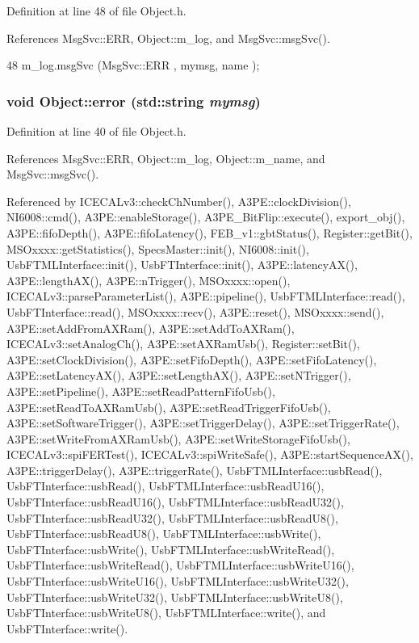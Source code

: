 Definition at line 48 of file Object.h.

References MsgSvc::ERR, Object::m\_\-log, and MsgSvc::msgSvc().


\begin{DoxyCode}
48 { m_log.msgSvc (MsgSvc::ERR     , mymsg, name ); }
\end{DoxyCode}
\hypertarget{classObject_a204a95f57818c0f811933917a30eff45}{
\subsubsection[{error}]{\setlength{\rightskip}{0pt plus 5cm}void Object::error (std::string {\em mymsg})}}
\label{classObject_a204a95f57818c0f811933917a30eff45}


Definition at line 40 of file Object.h.

References MsgSvc::ERR, Object::m\_\-log, Object::m\_\-name, and MsgSvc::msgSvc().

Referenced by ICECALv3::checkChNumber(), A3PE::clockDivision(), NI6008::cmd(), A3PE::enableStorage(), A3PE\_\-BitFlip::execute(), export\_\-obj(), A3PE::fifoDepth(), A3PE::fifoLatency(), FEB\_\-v1::gbtStatus(), Register::getBit(), MSOxxxx::getStatistics(), SpecsMaster::init(), NI6008::init(), UsbFTMLInterface::init(), UsbFTInterface::init(), A3PE::latencyAX(), A3PE::lengthAX(), A3PE::nTrigger(), MSOxxxx::open(), ICECALv3::parseParameterList(), A3PE::pipeline(), UsbFTMLInterface::read(), UsbFTInterface::read(), MSOxxxx::recv(), A3PE::reset(), MSOxxxx::send(), A3PE::setAddFromAXRam(), A3PE::setAddToAXRam(), ICECALv3::setAnalogCh(), A3PE::setAXRamUsb(), Register::setBit(), A3PE::setClockDivision(), A3PE::setFifoDepth(), A3PE::setFifoLatency(), A3PE::setLatencyAX(), A3PE::setLengthAX(), A3PE::setNTrigger(), A3PE::setPipeline(), A3PE::setReadPatternFifoUsb(), A3PE::setReadToAXRamUsb(), A3PE::setReadTriggerFifoUsb(), A3PE::setSoftwareTrigger(), A3PE::setTriggerDelay(), A3PE::setTriggerRate(), A3PE::setWriteFromAXRamUsb(), A3PE::setWriteStorageFifoUsb(), ICECALv3::spiFERTest(), ICECALv3::spiWriteSafe(), A3PE::startSequenceAX(), A3PE::triggerDelay(), A3PE::triggerRate(), UsbFTMLInterface::usbRead(), UsbFTInterface::usbRead(), UsbFTMLInterface::usbReadU16(), UsbFTInterface::usbReadU16(), UsbFTMLInterface::usbReadU32(), UsbFTInterface::usbReadU32(), UsbFTMLInterface::usbReadU8(), UsbFTInterface::usbReadU8(), UsbFTMLInterface::usbWrite(), UsbFTInterface::usbWrite(), UsbFTMLInterface::usbWriteRead(), UsbFTInterface::usbWriteRead(), UsbFTMLInterface::usbWriteU16(), UsbFTInterface::usbWriteU16(), UsbFTMLInterface::usbWriteU32(), UsbFTInterface::usbWriteU32(), UsbFTMLInterface::usbWriteU8(), UsbFTInterface::usbWriteU8(), UsbFTMLInterface::write(), and UsbFTInterface::write().


